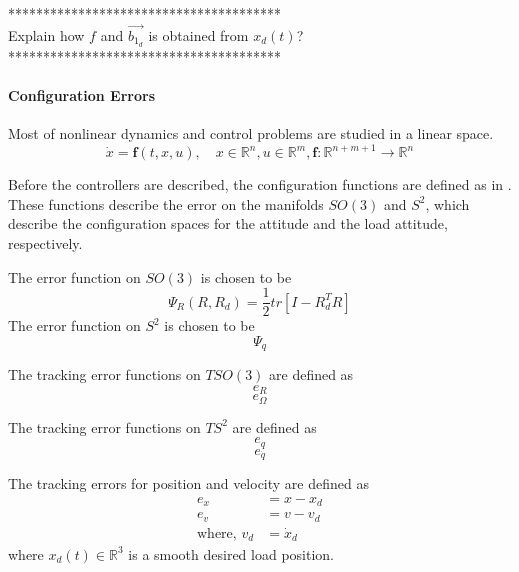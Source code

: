 ***************************************\\
Explain how $ f $ and $ \vec{b_{1_d}} $ is obtained from $ x_d(t) $?\\

***************************************\\

\paragraph{Configuration Errors}
Most of nonlinear dynamics and control problems are studied in a linear space.\\
\begin{equation}\label{key}
\dot{x}=\textbf{f}(t,x,u), \quad x\in\mathbb{R}^n, u\in\mathbb{R}^m, \textbf{f}:\mathbb{R}^{n+m+1}\rightarrow\mathbb{R}^n
\end{equation}

Before the controllers are described, the configuration functions are defined as in \cite{Bullo2005}. These functions describe the error on the manifolds $ SO(3) $ and $ S^2 $, which describe the configuration spaces for the  attitude and the load attitude, respectively.


The error function on $ SO(3) $ is chosen to be \cite{Lee2010}
\begin{equation}\label{eq:errorfunc}
\Psi_R(R,R_d)=\frac{1}{2}tr\left[I-R_d^TR\right]
\end{equation}
The error function on $ S^2 $ is chosen to be 
\begin{equation}\label{key}
\Psi_q
\end{equation}


The tracking error functions on $ TSO(3) $ are defined as
\begin{equation}\label{key}
e_R
\end{equation}
\begin{equation}\label{key}
e_\Omega 
\end{equation}

The tracking error functions on $ TS^2$ are defined as
\begin{equation}\label{key}
e_q
\end{equation}
\begin{equation}\label{key}
e_{\dot{q}} 
\end{equation}

The tracking errors for position and velocity are defined as
\begin{align}\label{key}
e_x&=x-x_d\\
e_v&=v-v_d\\
\text{where, }v_d&=\dot{x}_d
\end{align}
where $ x_d(t) \in \mathbb{R}^3$ is a smooth desired load position.

